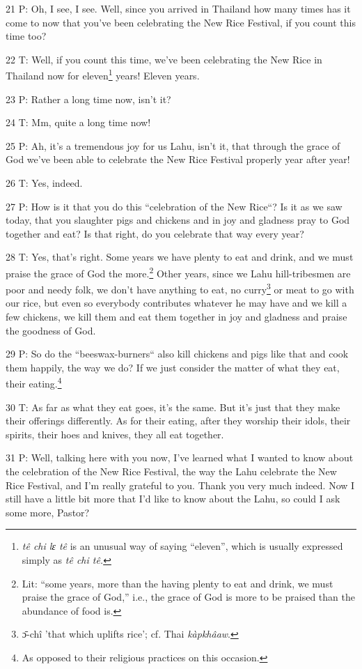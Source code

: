 21 P: Oh, I see, I see. Well, since you arrived in Thailand how many times has
it come to now that you've been celebrating the New Rice Festival, if you count
this time too?

22 T: Well, if you count this time, we've been celebrating the New Rice in Thailand
now for eleven\footnote{\textit{tê chi lɛ tê} is an unusual way of saying ``eleven'', which is usually expressed simply as \textit{tê chi tê.}} years! Eleven years.

23 P: Rather a long time now, isn't it?

24 T: Mm, quite a long time now!

25 P: Ah, it's a tremendous joy for us Lahu, isn't it, that through the grace of
God we've been able to celebrate the New Rice Festival properly year after year!

26 T: Yes, indeed.

27 P: How is it that you do this ``celebration of the New Rice``?
Is it as we saw today, that you slaughter pigs and chickens and in joy and gladness
pray to God together and eat? Is that right, do you celebrate that way every year?

28 T: Yes, that's right. Some years we have plenty to eat and drink, and we must
praise the grace of God the more.\footnote{Lit: ``some years, more than the having plenty to eat and drink, we must praise the grace of God,'' i.e., the grace of God is more to be praised than the abundance of food is.} Other years, since we Lahu hill-tribesmen
are poor and needy folk, we don't have anything to eat, no curry\footnote{ɔ̄-chî 'that which uplifts rice'; cf. Thai \textit{kàpkhâaw}.} or meat to
go with our rice, but even so everybody contributes whatever he may have and we
kill a few chickens, we kill them and eat them together in joy and gladness and
praise the goodness of God.

29 P: So do the ``beeswax-burners`` also kill chickens and pigs
like that and cook them happily, the way we do? If we just consider the matter
of what they eat, their eating.\footnote{As opposed to their religious practices on this occasion.}

30 T: As far as what they eat goes, it's the same. But it's just that they make
their offerings differently. As for their eating, after they worship their idols,
their spirits, their hoes and knives, they all eat together.

31 P: Well, talking here with you now, I've learned what I wanted to know about
the celebration of the New Rice Festival, the way the Lahu celebrate the New Rice
Festival, and I'm really grateful to you. Thank you very much indeed. Now I still
have a little bit more that I'd like to know about the Lahu, so could I ask some
more, Pastor?

